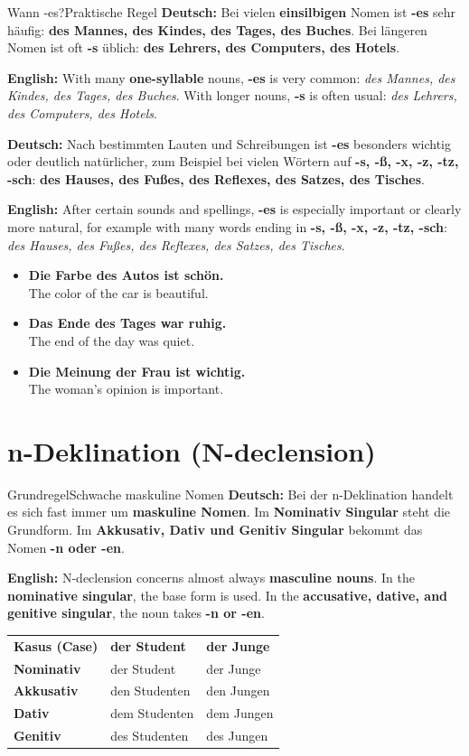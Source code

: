 \documentclass[a4paper,11pt]{article}
\newcommand{\GermanText}[1]{\textbf{Deutsch: }#1\par}
\newcommand{\EnglishText}[1]{{\small\color{SoftGray}\textbf{English: }#1\par}}
\newcommand{\ExampleItem}[2]{\item \textbf{#1}\\{\small\color{SoftGray}#2}}
\begin{document}
\begin{grammarentry}{Wann -es?}{Praktische Regel}
\GermanText{Bei vielen \textbf{einsilbigen} Nomen ist \textbf{-es} sehr häufig: \textbf{des Mannes, des Kindes, des Tages, des Buches}. Bei längeren Nomen ist oft \textbf{-s} üblich: \textbf{des Lehrers, des Computers, des Hotels}.}
\EnglishText{With many \textbf{one-syllable} nouns, \textbf{-es} is very common: \emph{des Mannes, des Kindes, des Tages, des Buches}. With longer nouns, \textbf{-s} is often usual: \emph{des Lehrers, des Computers, des Hotels}.}

\GermanText{Nach bestimmten Lauten und Schreibungen ist \textbf{-es} besonders wichtig oder deutlich natürlicher, zum Beispiel bei vielen Wörtern auf \textbf{-s, -ß, -x, -z, -tz, -sch}: \textbf{des Hauses, des Fußes, des Reflexes, des Satzes, des Tisches}.}
\EnglishText{After certain sounds and spellings, \textbf{-es} is especially important or clearly more natural, for example with many words ending in \textbf{-s, -ß, -x, -z, -tz, -sch}: \emph{des Hauses, des Fußes, des Reflexes, des Satzes, des Tisches}.}
\end{grammarentry}

\begin{exbox}
\begin{itemize}
\ExampleItem{Die Farbe des Autos ist schön.}{The color of the car is beautiful.}
\ExampleItem{Das Ende des Tages war ruhig.}{The end of the day was quiet.}
\ExampleItem{Die Meinung der Frau ist wichtig.}{The woman's opinion is important.}
\end{itemize}
\end{exbox}

\section{n-Deklination \textnormal{(N-declension)}}
\begin{grammarentry}{Grundregel}{Schwache maskuline Nomen}
\GermanText{Bei der n-Deklination handelt es sich fast immer um \textbf{maskuline Nomen}. Im \textbf{Nominativ Singular} steht die Grundform. Im \textbf{Akkusativ, Dativ und Genitiv Singular} bekommt das Nomen \textbf{-n oder -en}.}
\EnglishText{N-declension concerns almost always \textbf{masculine nouns}. In the \textbf{nominative singular}, the base form is used. In the \textbf{accusative, dative, and genitive singular}, the noun takes \textbf{-n or -en}.}
\end{grammarentry}

\begin{longtable}{>{\bfseries}p{3.2cm}|p{4.6cm}|p{4.6cm}}
\rowcolor{HeaderBlueDark}
\color{white}\textbf{Kasus (Case)} &
\color{white}\textbf{der Student} &
\color{white}\textbf{der Junge} \\
Nominativ & der Student & der Junge \\
Akkusativ & den Studenten & den Jungen \\
Dativ & dem Studenten & dem Jungen \\
Genitiv & des Studenten & des Jungen \\
\end{longtable}
\end{document}
